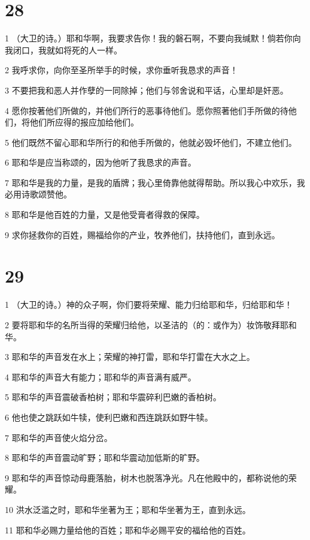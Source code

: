 \chapter{28}

\par 1 （大卫的诗。）耶和华啊，我要求告你！我的磐石啊，不要向我缄默！倘若你向我闭口，我就如将死的人一样。
\par 2 我呼求你，向你至圣所举手的时候，求你垂听我恳求的声音！
\par 3 不要把我和恶人并作孽的一同除掉；他们与邻舍说和平话，心里却是奸恶。
\par 4 愿你按著他们所做的，并他们所行的恶事待他们。愿你照著他们手所做的待他们，将他们所应得的报应加给他们。
\par 5 他们既然不留心耶和华所行的和他手所做的，他就必毁坏他们，不建立他们。
\par 6 耶和华是应当称颂的，因为他听了我恳求的声音。
\par 7 耶和华是我的力量，是我的盾牌；我心里倚靠他就得帮助。所以我心中欢乐，我必用诗歌颂赞他。
\par 8 耶和华是他百姓的力量，又是他受膏者得救的保障。
\par 9 求你拯救你的百姓，赐福给你的产业，牧养他们，扶持他们，直到永远。

\chapter{29}

\par 1 （大卫的诗。）神的众子啊，你们要将荣耀、能力归给耶和华，归给耶和华！
\par 2 要将耶和华的名所当得的荣耀归给他，以圣洁的（的：或作为）妆饰敬拜耶和华。
\par 3 耶和华的声音发在水上；荣耀的神打雷，耶和华打雷在大水之上。
\par 4 耶和华的声音大有能力；耶和华的声音满有威严。
\par 5 耶和华的声音震破香柏树；耶和华震碎利巴嫩的香柏树。
\par 6 他也使之跳跃如牛犊，使利巴嫩和西连跳跃如野牛犊。
\par 7 耶和华的声音使火焰分岔。
\par 8 耶和华的声音震动旷野；耶和华震动加低斯的旷野。
\par 9 耶和华的声音惊动母鹿落胎，树木也脱落净光。凡在他殿中的，都称说他的荣耀。
\par 10 洪水泛滥之时，耶和华坐著为王；耶和华坐著为王，直到永远。
\par 11 耶和华必赐力量给他的百姓；耶和华必赐平安的福给他的百姓。

